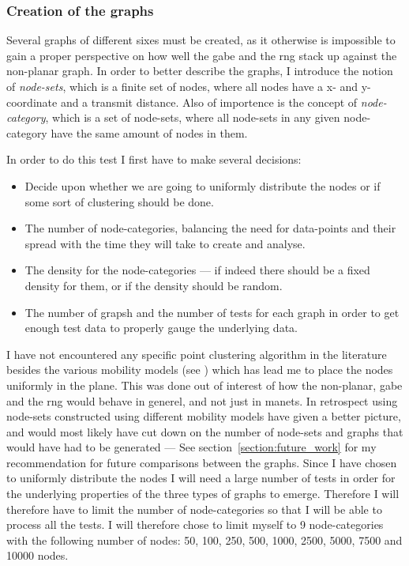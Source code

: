 \subsubsection{Creation of the graphs}
Several graphs of different sixes must be created, as it otherwise is impossible to gain a proper perspective on how well the \ac{gabe} and the \ac{rng} stack up against the non-planar graph. In order to better describe the graphs, I introduce the notion of \emph{node-sets}, which is a finite set of nodes, where all nodes have a x- and y-coordinate and a transmit distance. Also of importence is the concept of \emph{node-category}, which is a set of node-sets, where all node-sets in any given node-category have the same amount of nodes in them. 

In order to do this test I first have to make several decisions:
\begin{itemize}
\item Decide upon whether we are going to uniformly distribute the nodes or if some sort of clustering should be done. 
\item The number of node-categories, balancing the need for data-points and their spread with the time they will take to create and analyse.
\item The density for the node-categories --- if indeed there should be a fixed density for them, or if the density should be random.
\item The number of grapsh and the number of tests for each graph in order to get enough test data to properly gauge the underlying data.
\end{itemize}

I have not encountered any specific point clustering algorithm in the literature besides the various mobility models (see \cite{disasterArea, MobilityAdHocResearch}) which has lead me to place the nodes uniformly in the plane. This was done out of interest of how the non-planar, \ac{gabe} and the \ac{rng} would behave in generel, and not just in \acp{manet}. In retrospect using node-sets constructed using different  mobility models have given a better picture, and would most likely have cut down on the number of node-sets and graphs that would have had to be generated --- See section~\ref{section:future_work} for my recommendation for future comparisons between the graphs.   
Since I have chosen to uniformly distribute the nodes I will need a large number of tests in order for the underlying properties of the three types of graphs to emerge. Therefore I will therefore have to limit the number of node-categories so that I will be able to process all the tests. I will therefore chose to limit myself to 9 node-categories with the following number of nodes: 50, 100, 250, 500, 1000, 2500, 5000, 7500 and 10000 nodes.

